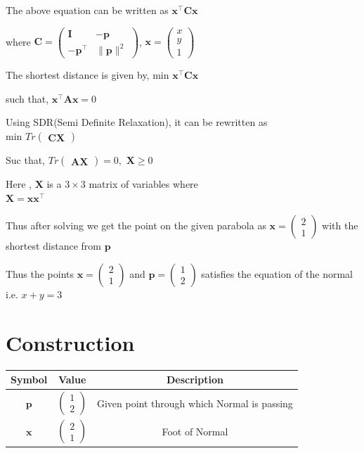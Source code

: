 \documentclass[journal,10pt,twocolumn]{article}
\let\vec\mathbf
\newcommand{\myvec}[1]{\ensuremath{\begin{pmatrix}#1\end{pmatrix}}}
\begin{document}
\begin{center}
The above equation can be written as $\vec{x^{\top}}\vec{C}\vec{x}$
\end{center}
\begin{center}
where $\vec{C} = \myvec{\vec{I}&-\vec{p}\\ -\vec{p^{\top}}& \|\vec{p}\|^2}$, $\vec{x} = \myvec{x\\y\\1}$
\end{center}
\begin{center}
The shortest distance is given by, min $\vec{x^{\top}}\vec{C}\vec{x}$
\end{center}
\begin{center}
such that,  $\vec{x^{\top}}\vec{A}\vec{x} = 0$
	\\ \raggedright Using SDR(Semi Definite Relaxation), it can be rewritten as 
	\\ \centering min $Tr\myvec{\vec{C}\vec{X}}$
\end{center}
\begin{center}
Suc that, $ Tr\myvec{\vec{A}\vec{X}} =0,$
 $\vec{X}\ge0$
\end{center}
\begin{center}
Here , $\vec{X}$ is a  $3\times3$ matrix of variables where
	\\ \centering $ \vec{X} = \vec{x}\vec{x^{\top}}$
\end{center}



Thus after solving we get the point on the given parabola as $\vec{x} = \myvec{2\\1}$ with the shortest distance from  $\vec{p}$
\begin{center}
    Thus the points $\vec{x} = \myvec{2\\1}$ and $\vec{p} = \myvec{1\\2}$ satisfies the equation of the normal i.e. $x+y=3$
\end{center} 

\section*{\large Construction}
{
\setlength\extrarowheight{5pt}
\begin{tabular}{|c|c|c|}
	\hline
	\textbf{Symbol}&\textbf{Value}&\textbf{Description}\\[5pt]
	\hline
	$\vec{p}$&$\myvec{1 \\ 2}$&Given point through which Normal is passing\\[5pt]
	\hline
	$\vec{x}$&$\myvec{2 \\ 1}$&Foot of Normal\\[5pt]
	\hline
\end{tabular}
}
\end{document}
